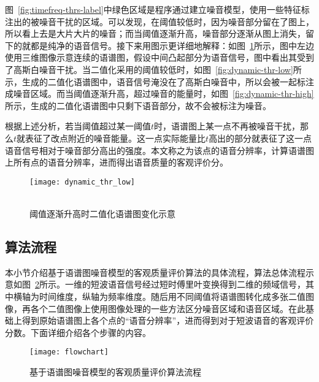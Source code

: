 图~\ref{fig:timefreq-thrs-label}中绿色区域是程序通过建立噪音模型，使用一些特征标注出的被噪音干扰的区域。可以发现，在阈值较低时，因为噪音部分留在了图上，所以看上去是大片大片的噪音；而当阈值逐渐升高，噪音部分逐渐从图上消失，留下的就都是纯净的语音信号。接下来用图示更详细地解释：如图~\ref{fig:dynamic-thr}所示，图中左边使用三维图像示意连续的语谱图，假设中间凸起部分为语音信号，图中看出其受到了高斯白噪音干扰。当二值化采用的阈值较低时，如图~\ref{fig:dynamic-thr-low}所示，生成的二值化语谱图中，语音信号淹没在了高斯白噪音中，所以会被一起标注成噪音区域。而当阈值逐渐升高，超过噪音的能量时，如图~\ref{fig:dynamic-thr-high}所示，生成的二值化语谱图中只剩下语音部分，故不会被标注为噪音。

根据上述分析，若当阈值超过某一阈值$t$时，语谱图上某一点不再被噪音干扰，那么$t$就表征了改点附近的噪音能量。这一点实际能量比$t$高出的部分就表征了这一点语音信号相对于噪音部分高出的强度。本文称之为该点的语音分辨率，计算语谱图上所有点的语音分辨率，进而得出语音质量的客观评价分。

\begin{figure}
\centering
{} {
    \texttt{[image: dynamic\_thr\_low]}
}
\vspace{0.8ex}
\\
\vspace{0.8ex}
\\
\caption{阈值逐渐升高时二值化语谱图变化示意\label{fig:dynamic-thr}}
\end{figure}

\subsection{算法流程}

本小节介绍基于语谱图噪音模型的客观质量评价算法的具体流程，算法总体流程示意如图~\ref{fig:flowchart}所示。一维的短波语音信号经过短时傅里叶变换得到二维的频域信号，其中横轴为时间维度，纵轴为频率维度。随后用不同阈值将语谱图转化成多张二值图像，再各个二值图像上使用图像处理的一些方法区分噪音区域和语音区域。在此基础上得到原始语谱图上各个点的“语音分辨率”，进而得到对于短波语音的客观评价分数。下面详细介绍各个步骤的内容。

\begin{figure}
\centering
\texttt{[image: flowchart]}
\caption{基于语谱图噪音模型的客观质量评价算法流程\label{fig:flowchart}}
\end{figure}

